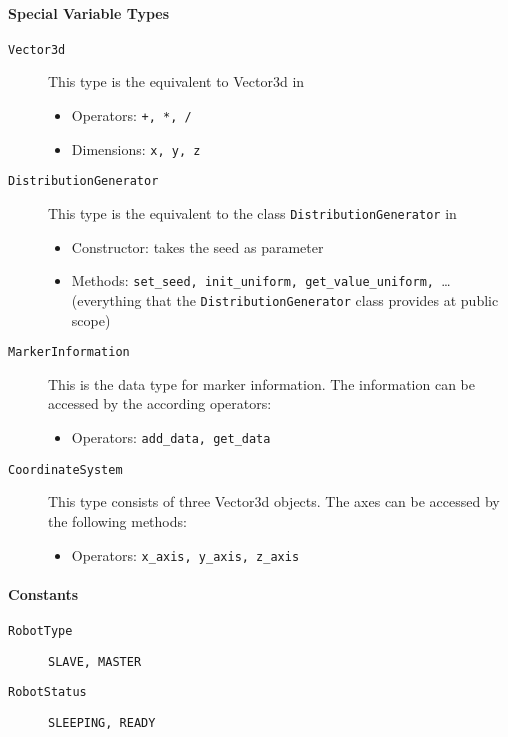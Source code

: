 \paragraph{Special Variable Types}
\begin{description}
	\item [\texttt{Vector3d}] This type is the \Lua equivalent to Vector3d in \RSS
	\begin{itemize}
		\item Operators: \texttt{+, *, /}
		\item Dimensions: \texttt{x, y, z}
	\end{itemize}
	\item [\texttt{DistributionGenerator}] This type is the \Lua equivalent to the class \texttt{DistributionGenerator} in \RSS
	\begin{itemize}
		\item Constructor: takes the seed as parameter
		\item Methods: \texttt{set\_seed, init\_uniform, get\_value\_uniform, }\ldots (everything that the \texttt{DistributionGenerator} class provides at public scope)
	\end{itemize}
	\item [\texttt{MarkerInformation}] This is the data type for marker information. The information can be accessed by the according operators:
	\begin{itemize}
		\item Operators: \texttt{add\_data, get\_data}
	\end{itemize}
	\item [\texttt{CoordinateSystem}] This type consists of three Vector3d objects. The axes can be accessed by the following methods:
	\begin{itemize}
		\item Operators: \texttt{x\_axis, y\_axis, z\_axis}
	\end{itemize}
\end{description}

\paragraph{\Lua Constants}
\begin{description}
	\item [\texttt{RobotType}] \texttt{SLAVE, MASTER}
	\item [\texttt{RobotStatus}] \texttt{SLEEPING, READY}
\end{description}

